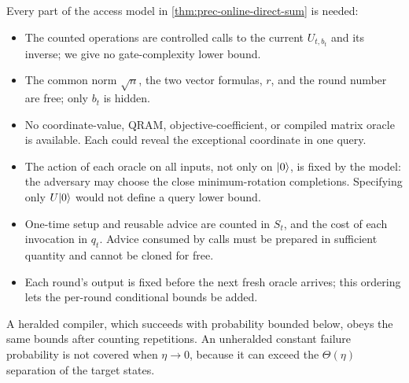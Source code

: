Every part of the access model in \cref{thm:prec-online-direct-sum} is
needed:
\begin{itemize}[leftmargin=*]
 \item The counted operations are controlled calls to the current
 $U_{t,b_t}$ and its inverse; we give no gate-complexity lower bound.
 \item The common norm $\sqrt n$, the two vector formulas, $r$, and the round
 number are free; only $b_t$ is hidden.
 \item No coordinate-value, QRAM, objective-coefficient, or compiled matrix
 oracle is available.  Each could reveal the exceptional coordinate in one
 query.
 \item The action of each oracle on all inputs, not only on $\lvert 0\rangle$, is
 fixed by the model: the adversary may choose the close minimum-rotation
 completions.  Specifying only $U\lvert 0\rangle$ would not define a query lower bound.
 \item One-time setup and reusable advice are counted in $S_t$, and the cost
 of each invocation in $q_t$.  Advice consumed by calls must be
 prepared in sufficient quantity and cannot be cloned for free.
 \item Each round's output is fixed before the next fresh oracle arrives;
 this ordering lets the per-round conditional bounds be added.
\end{itemize}
A heralded compiler, which succeeds with probability bounded below, obeys
the same bounds after counting repetitions.  An unheralded constant failure
probability is not covered when $\eta\to0$, because it can exceed the
$\Theta(\eta)$ separation of the target states.

